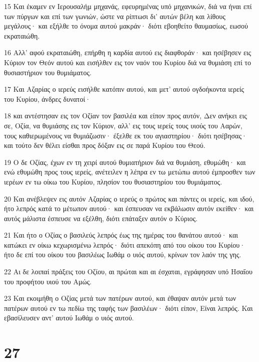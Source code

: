 \par 15 Και έκαμεν εν Ιερουσαλήμ μηχανάς, εφευρημένας υπό μηχανικών, διά να ήναι επί των πύργων και επί των γωνιών, ώστε να ρίπτωσι δι' αυτών βέλη και λίθους μεγάλους· και εξήλθε το όνομα αυτού μακράν· διότι εβοηθείτο θαυμασίως, εωσού εκραταιώθη.
\par 16 Αλλ' αφού εκραταιώθη, επήρθη η καρδία αυτού εις διαφθοράν· και ησέβησεν εις Κύριον τον Θεόν αυτού και εισήλθεν εις τον ναόν του Κυρίου διά να θυμιάση επί το θυσιαστήριον του θυμιάματος.
\par 17 Και Αζαρίας ο ιερεύς εισήλθε κατόπιν αυτού, και μετ' αυτού ογδοήκοντα ιερείς του Κυρίου, άνδρες δυνατοί·
\par 18 και αντέστησαν εις τον Οζίαν τον βασιλέα και είπον προς αυτόν, Δεν ανήκει εις σε, Οζία, να θυμιάσης εις τον Κύριον, αλλ' εις τους ιερείς τους υιούς του Ααρών, τους καθιερωμένους να θυμιάζωσιν· έξελθε εκ του αγιαστηρίου· διότι ησέβησας· και τούτο δεν θέλει είσθαι προς δόξαν εις σε παρά Κυρίου του Θεού.
\par 19 Ο δε Οζίας, έχων εν τη χειρί αυτού θυμιατήριον διά να θυμιάση, εθυμώθη· και ενώ εθυμώθη προς τους ιερείς, ανέτειλεν η λέπρα εν τω μετώπω αυτού έμπροσθεν των ιερέων εν τω οίκω του Κυρίου, πλησίον του θυσιαστηρίου του θυμιάματος.
\par 20 Και ανέβλεψεν εις αυτόν Αζαρίας ο ιερεύς ο πρώτος και πάντες οι ιερείς, και ιδού, ήτο λεπρός κατά το μέτωπον αυτού· και έσπευσαν να εκβάλωσιν αυτόν εκείθεν· και αυτός μάλιστα έσπευσε να εξέλθη, διότι επάταξεν αυτόν ο Κύριος.
\par 21 Και ήτο ο Οζίας ο βασιλεύς λεπρός έως της ημέρας του θανάτου αυτού· και κατώκει εν οίκω κεχωρισμένω λεπρός· διότι απεκόπη από του οίκου του Κυρίου· ήτο δε επί του οίκου του βασιλέως Ιωθάμ ο υιός αυτού, κρίνων τον λαόν της γης.
\par 22 Αι δε λοιπαί πράξεις του Οζίου, αι πρώται και αι έσχαται, εγράφησαν υπό Ησαΐου του προφήτου υιού του Αμώς.
\par 23 Και εκοιμήθη ο Οζίας μετά των πατέρων αυτού, και έθαψαν αυτόν μετά των πατέρων αυτού εν τω πεδίω της ταφής των βασιλέων· διότι είπον, Είναι λεπρός. Και εβασίλευσεν αντ' αυτού Ιωθάμ ο υιός αυτού.

\chapter{27}

